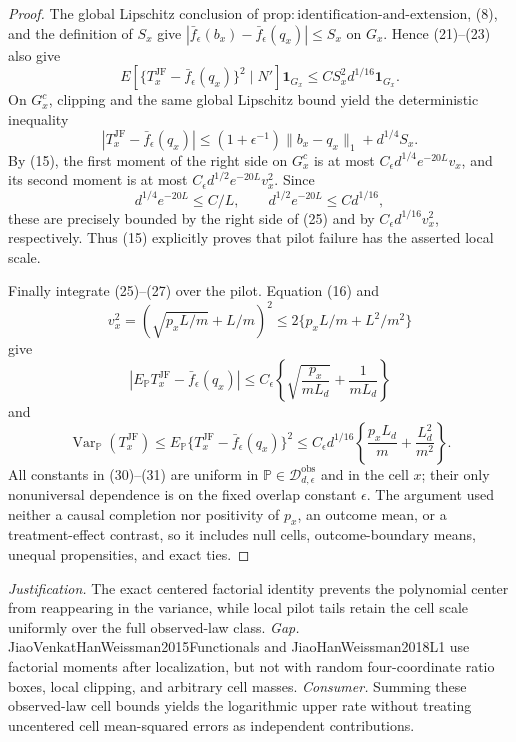 \documentclass{article}
\begin{document}
\begin{proof}
The global Lipschitz conclusion of \(\mathrm{prop:identification\mbox{-}and\mbox{-}extension}\), (8), and the definition of \(S_x\) give \(|\bar f_\epsilon(b_x)-\bar f_\epsilon(q_x)|\leq S_x\) on \(G_x\).  Hence (21)--(23) also give
\[
 E\!\left[\{T_x^{\mathrm{JF}}-\bar f_\epsilon(q_x)\}^2
 \mid N'\right]\mathbf1_{G_x}
 \leq C S_x^2d^{1/16}\mathbf1_{G_x}.                              \tag{26}
\]
On \(G_x^c\), clipping and the same global Lipschitz bound yield the deterministic inequality
\[
 |T_x^{\mathrm{JF}}-\bar f_\epsilon(q_x)|
 \leq(1+\epsilon^{-1})\|b_x-q_x\|_1+d^{1/4}S_x.                  \tag{27}
\]
By (15), the first moment of the right side on \(G_x^c\) is at most \(C_\epsilon d^{1/4}e^{-20L}v_x\), and its second moment is at most \(C_\epsilon d^{1/2}e^{-20L}v_x^2\).  Since
\[
 d^{1/4}e^{-20L}\leq C/L,
 \qquad d^{1/2}e^{-20L}\leq C d^{1/16},                            \tag{28}
\]
these are precisely bounded by the right side of (25) and by \(C_\epsilon d^{1/16}v_x^2\), respectively.  Thus (15) explicitly proves that pilot failure has the asserted local scale.

Finally integrate (25)--(27) over the pilot.  Equation (16) and
\[
 v_x^2=(\sqrt{p_xL/m}+L/m)^2
 \leq2\{p_xL/m+L^2/m^2\}                                        \tag{29}
\]
give
\[
 \left|E_{\mathbb P}T_x^{\mathrm{JF}}-\bar f_\epsilon(q_x)\right|
 \leq C_\epsilon\left\{\sqrt{\frac{p_x}{mL_d}}+\frac1{mL_d}\right\} \tag{30}
\]
and
\[
 \operatorname{Var}_{\mathbb P}(T_x^{\mathrm{JF}})
 \leq E_{\mathbb P}\{T_x^{\mathrm{JF}}-\bar f_\epsilon(q_x)\}^2
 \leq C_\epsilon d^{1/16}
 \left\{\frac{p_xL_d}{m}+\frac{L_d^2}{m^2}\right\}.             \tag{31}
\]
All constants in (30)--(31) are uniform in \(\mathbb P\in\mathcal D_{d,\epsilon}^{\mathrm{obs}}\) and in the cell \(x\); their only nonuniversal dependence is on the fixed overlap constant \(\epsilon\).  The argument used neither a causal completion nor positivity of \(p_x\), an outcome mean, or a treatment-effect contrast, so it includes null cells, outcome-boundary means, unequal propensities, and exact ties.
\end{proof}
\par\smallskip\noindent \textit{Justification.} The exact centered factorial identity prevents the polynomial center from reappearing in the variance, while local pilot tails retain the cell scale uniformly over the full observed-law class. \textit{Gap.} JiaoVenkatHanWeissman2015Functionals and JiaoHanWeissman2018L1 use factorial moments after localization, but not with random four-coordinate ratio boxes, local clipping, and arbitrary cell masses. \textit{Consumer.} Summing these observed-law cell bounds yields the logarithmic upper rate without treating uncentered cell mean-squared errors as independent contributions.
\end{document}

